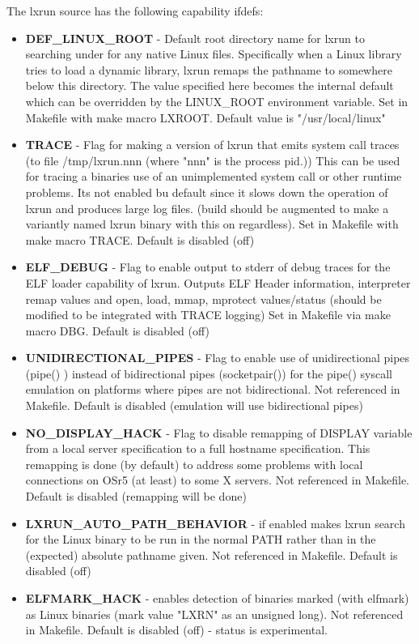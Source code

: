 \documentclass[letterpaper]{article}
\begin{document}
The lxrun source has the following capability ifdefs:
\begin{itemize}
\item {\bfseries DEF\_LINUX\_ROOT} -
Default root directory name for lxrun to searching under for any
native Linux files. 
Specifically when a Linux library tries to load a dynamic library, lxrun
remaps the pathname to somewhere below this directory.  
The value specified here becomes the internal default which can be 
overridden by the LINUX\_ROOT environment variable.
Set in Makefile with make macro LXROOT.
Default value is "/usr/local/linux"
\item {\bfseries TRACE} -
Flag for making a version of lxrun that emits system call traces 
(to file /tmp/lxrun.nnn (where "nnn" is the process pid.))
This can be used for tracing a binaries use of an unimplemented 
system call or other runtime problems. Its not enabled bu default 
since it slows down the operation of lxrun and produces large log files.
(build should be augmented to make a variantly named lxrun binary with this 
on regardless).
Set in Makefile with make macro TRACE.
Default is disabled (off)
\item {\bfseries ELF\_DEBUG} -
Flag to enable output to stderr of debug traces for the 
ELF loader capability of lxrun. Outputs ELF Header information,
interpreter remap values and open, load, mmap, mprotect values/status
(should be modified to be integrated with TRACE logging)
Set in Makefile via make macro DBG.
Default is disabled (off)
\item {\bfseries UNIDIRECTIONAL\_PIPES} -
Flag to enable use of unidirectional pipes (pipe() ) 
instead of bidirectional pipes (socketpair()) for the pipe()
syscall emulation on platforms where pipes are not bidirectional.
Not referenced in Makefile.
Default is disabled (emulation will use bidirectional pipes)
\item {\bfseries NO\_DISPLAY\_HACK} -
Flag to disable remapping of DISPLAY variable from a local server 
specification to a full hostname specification.
This remapping is done (by default) to address some 
problems with local connections on OSr5 (at least) to some X servers.
Not referenced in Makefile.
Default is disabled (remapping will be done)
\item {\bfseries LXRUN\_AUTO\_PATH\_BEHAVIOR} -
if enabled makes lxrun search for the Linux binary to be run in the 
normal PATH rather than in the (expected) absolute pathname given.
Not referenced in Makefile.
Default is disabled (off)
\item {\bfseries ELFMARK\_HACK} -
enables detection of binaries marked (with elfmark) as Linux binaries
(mark value "LXRN" as an unsigned long).
Not referenced in Makefile.
Default is disabled (off) - status is experimental.
\end{itemize}
\end{document}
